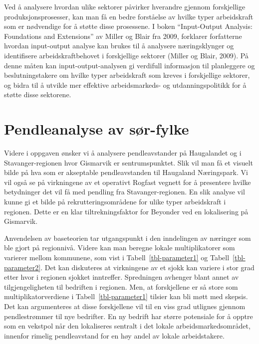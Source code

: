 \documentclass[
]{article}
\begin{document}
Ved å analysere hvordan ulike sektorer påvirker hverandre gjennom
forskjellige produksjonsprosesser, kan man få en bedre forståelse av
hvilke typer arbeidskraft som er nødvendige for å støtte disse
prosessene. I boken ``Input-Output Analysis: Foundations and
Extensions'' av Miller og Blair fra 2009, forklarer forfatterne hvordan
input-output analyse kan brukes til å analysere næringsklynger og
identifisere arbeidskraftbehovet i forskjellige sektorer (Miller og
Blair, 2009). På denne måten kan input-output-analysen gi verdifull
informasjon til planleggere og beslutningstakere om hvilke typer
arbeidskraft som kreves i forskjellige sektorer, og bidra til å utvikle
mer effektive arbeidsmarkeds- og utdanningspolitikk for å støtte disse
sektorene.

\hypertarget{pendleanalyse-av-suxf8r-fylke}{%
\section{Pendleanalyse av
sør-fylke}\label{pendleanalyse-av-suxf8r-fylke}}

Videre i oppgaven ønsker vi å analysere pendleavstander på Haugalandet
og i Stavanger-regionen hvor Gismarvik er sentrumspunktet. Slik vil man
få et visuelt bilde på hva som er akseptable pendleavstanden til
Haugaland Næringspark. Vi vil også se på virkningene av et operativt
Rogfast vegnett for å presentere hvilke betydninger det vil få med
pendling fra Stavanger-regionen. En slik analyse vil kunne gi et bilde
på rekrutteringsområdene for ulike typer arbeidskraft i regionen. Dette
er en klar tiltrekningsfaktor for Beyonder ved en lokalisering på
Gismarvik.

Anvendelsen av baseteorien tar utgangspunkt i den inndelingen av
næringer som ble gjort på regionnivå. Videre kan man beregne lokale
multiplikatorer som varierer mellom kommunene, som vist i
Tabell~\ref{tbl-parameter1} og Tabell~\ref{tbl-parameter2}. Det kan
diskuteres at virkningene av et sjokk kan variere i stor grad etter hvor
i regionen sjokket inntreffer. Spredningen avhenger blant annet av
tilgjengeligheten til bedriften i regionen. Men, at forskjellene er så
store som multiplikatorverdiene i Tabell~\ref{tbl-parameter1} tilsier
kan bli møtt med skepsis. Det kan argumenteres at disse forskjellene vil
til en viss grad utlignes gjennom pendlestrømmer til nye bedrifter. En
ny bedrift har større potensiale for å opptre som en vekstpol når den
lokaliseres sentralt i det lokale arbeidsmarkedsområdet, innenfor
rimelig pendleavstand for en høy andel av lokale arbeidstakere.
\end{document}
